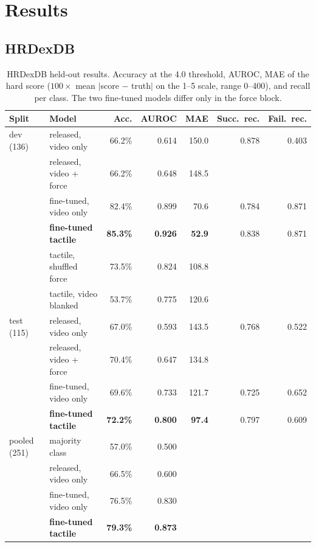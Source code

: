 \documentclass{article}
\begin{document}
\section{Results}
\label{sec:results}

\subsection{HRDexDB}

\begin{table}[t]
  \caption{HRDexDB held-out results. Accuracy at the 4.0 threshold, AUROC, MAE of the hard
  score ($100 \times$ mean $|$score $-$ truth$|$ on the 1--5 scale, range 0--400), and recall per class. The two fine-tuned models differ only in the force block.}
  \label{tab:hrdexdb}
  \centering
  \small
  \begin{tabular}{llrrrrr}
    \toprule
    Split & Model & Acc. & AUROC & MAE & Succ.\ rec. & Fail.\ rec. \\
    \midrule
    dev (136) & released, video only & 66.2\% & 0.614 & 150.0 & 0.878 & 0.403 \\
     & released, video + force & 66.2\% & 0.648 & 148.5 & & \\
     & fine-tuned, video only & 82.4\% & 0.899 & 70.6 & 0.784 & 0.871 \\
     & \textbf{fine-tuned tactile} & \textbf{85.3\%} & \textbf{0.926} & \textbf{52.9} & 0.838 & 0.871 \\
     & tactile, shuffled force & 73.5\% & 0.824 & 108.8 & & \\
     & tactile, video blanked & 53.7\% & 0.775 & 120.6 & & \\
    \midrule
    test (115) & released, video only & 67.0\% & 0.593 & 143.5 & 0.768 & 0.522 \\
     & released, video + force & 70.4\% & 0.647 & 134.8 & & \\
     & fine-tuned, video only & 69.6\% & 0.733 & 121.7 & 0.725 & 0.652 \\
     & \textbf{fine-tuned tactile} & \textbf{72.2\%} & \textbf{0.800} & \textbf{97.4} & 0.797 & 0.609 \\
    \midrule
    pooled (251) & majority class & 57.0\% & 0.500 & & & \\
     & released, video only & 66.5\% & 0.600 & & & \\
     & fine-tuned, video only & 76.5\% & 0.830 & & & \\
     & \textbf{fine-tuned tactile} & \textbf{79.3\%} & \textbf{0.873} & & & \\
    \bottomrule
  \end{tabular}
\end{table}
\end{document}
